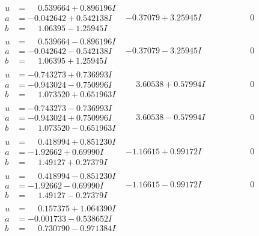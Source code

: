 \documentclass[1p]{elsarticle_modified}
\theoremstyle{definition}
\begin{document}
$$\begin{array}{c|c|c}
\begin{aligned}
u &= \phantom{-}0.539664 + 0.896196 I \\
a &= -0.042642 + 0.542138 I \\
b &= \phantom{-}1.06395 - 1.25945 I\end{aligned}
 & -0.37079 + 3.25945 I & \phantom{-0.000000 } 0 \\ \hline\begin{aligned}
u &= \phantom{-}0.539664 - 0.896196 I \\
a &= -0.042642 - 0.542138 I \\
b &= \phantom{-}1.06395 + 1.25945 I\end{aligned}
 & -0.37079 - 3.25945 I & \phantom{-0.000000 } 0 \\ \hline\begin{aligned}
u &= -0.743273 + 0.736993 I \\
a &= -0.943024 - 0.750996 I \\
b &= \phantom{-}1.073520 + 0.651963 I\end{aligned}
 & \phantom{-}3.60538 + 0.57994 I & \phantom{-0.000000 } 0 \\ \hline\begin{aligned}
u &= -0.743273 - 0.736993 I \\
a &= -0.943024 + 0.750996 I \\
b &= \phantom{-}1.073520 - 0.651963 I\end{aligned}
 & \phantom{-}3.60538 - 0.57994 I & \phantom{-0.000000 } 0 \\ \hline\begin{aligned}
u &= \phantom{-}0.418994 + 0.851230 I \\
a &= -1.92662 + 0.69990 I \\
b &= \phantom{-}1.49127 + 0.27379 I\end{aligned}
 & -1.16615 + 0.99172 I & \phantom{-0.000000 } 0 \\ \hline\begin{aligned}
u &= \phantom{-}0.418994 - 0.851230 I \\
a &= -1.92662 - 0.69990 I \\
b &= \phantom{-}1.49127 - 0.27379 I\end{aligned}
 & -1.16615 - 0.99172 I & \phantom{-0.000000 } 0 \\ \hline\begin{aligned}
u &= \phantom{-}0.157375 + 1.064390 I \\
a &= -0.001733 - 0.538652 I \\
b &= \phantom{-}0.730790 - 0.971384 I\end{aligned}

\end{array}$$
\end{document}
